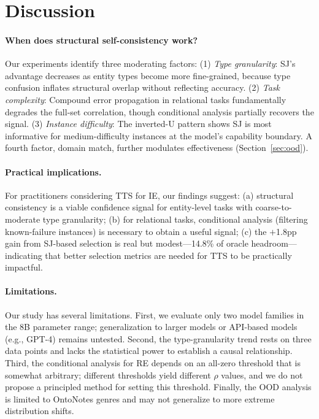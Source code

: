 \documentclass[11pt]{article}
\begin{document}
\section{Discussion}

\paragraph{When does structural self-consistency work?}
Our experiments identify three moderating factors:
(1) \emph{Type granularity}: SJ's advantage decreases as entity types become more fine-grained, because type confusion inflates structural overlap without reflecting accuracy.
(2) \emph{Task complexity}: Compound error propagation in relational tasks fundamentally degrades the full-set correlation, though conditional analysis partially recovers the signal.
(3) \emph{Instance difficulty}: The inverted-U pattern shows SJ is most informative for medium-difficulty instances at the model's capability boundary.
A fourth factor, domain match, further modulates effectiveness (Section~\ref{sec:ood}).

\paragraph{Practical implications.}
For practitioners considering TTS for IE, our findings suggest: (a) structural consistency is a viable confidence signal for entity-level tasks with coarse-to-moderate type granularity; (b) for relational tasks, conditional analysis (filtering known-failure instances) is necessary to obtain a useful signal; (c) the $+$1.8pp gain from SJ-based selection is real but modest---14.8\% of oracle headroom---indicating that better selection metrics are needed for TTS to be practically impactful.

\paragraph{Limitations.}
Our study has several limitations.
First, we evaluate only two model families in the 8B parameter range; generalization to larger models or API-based models (e.g., GPT-4) remains untested.
Second, the type-granularity trend rests on three data points and lacks the statistical power to establish a causal relationship.
Third, the conditional analysis for RE depends on an all-zero threshold that is somewhat arbitrary; different thresholds yield different $\rho$ values, and we do not propose a principled method for setting this threshold.
Finally, the OOD analysis is limited to OntoNotes genres and may not generalize to more extreme distribution shifts.
\end{document}
